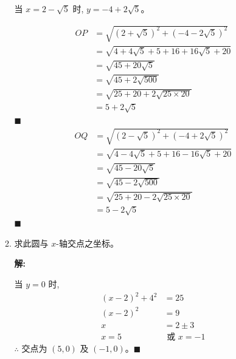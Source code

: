 \documentclass[10pt]{article}
\newcommand{\sol}{\textbf{解:} }
\begin{document}
\begin{enumerate}[leftmargin=*]
\begin{enumerate}
                当 $x = 2 - \sqrt{5}$ 时, $y = -4 + 2\sqrt{5}$。

                \begin{align*}
                  OP & = \sqrt{(2 + \sqrt{5})^{2} + (-4 - 2\sqrt{5})^{2}} \\
                     & = \sqrt{4 + 4\sqrt{5} + 5 + 16 + 16\sqrt{5} + 20}  \\
                     & = \sqrt{45 + 20\sqrt{5}}                           \\
                     & = \sqrt{45 + 2\sqrt{500}}                          \\
                     & = \sqrt{25 + 20 + 2\sqrt{25 \times 20}}            \\
                     & = 5 + 2\sqrt{5}
                \end{align*} \hfill$\blacksquare$
                \begin{align*}
                  OQ & = \sqrt{(2 - \sqrt{5})^{2} + (-4 + 2\sqrt{5})^{2}} \\
                     & = \sqrt{4 - 4\sqrt{5} + 5 + 16 - 16\sqrt{5} + 20}  \\
                     & = \sqrt{45 - 20\sqrt{5}}                           \\
                     & = \sqrt{45 - 2\sqrt{500}}                          \\
                     & = \sqrt{25 + 20 - 2\sqrt{25 \times 20}}            \\
                     & = 5 - 2\sqrt{5}
                \end{align*} \hfill$\blacksquare$

          \item 求此圆与 $x$-轴交点之坐标。

                \sol{}

                当 $y = 0$ 时,
                \begin{align*}
                  (x-2)^{2} + 4^{2} & = 25              \\
                  (x-2)^{2}         & = 9               \\
                  x                 & = 2 \pm 3         \\
                  x = 5             & \text{ 或 } x = -1
                \end{align*}
                $\therefore$ 交点为 $(5, 0)$ 及 $(-1, 0)$。\hfill$\blacksquare$

        \end{enumerate}


\end{enumerate}
\end{document}
